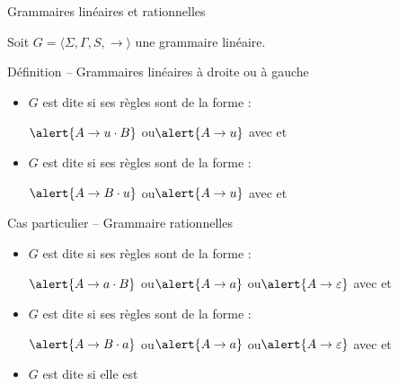 
\begingroup

\begin{frame}{Grammaires linéaires et rationnelles}

  Soit \alert{$G = \langle \Sigma, \Gamma, S, \rightarrow \rangle$} une grammaire linéaire. 

  \begin{block}{Définition -- Grammaires linéaires à droite ou à gauche}
    \begin{itemize}
    \item $G$ est dite  si ses règles sont de la forme :
      \begin{center}
        $\alert{A \rightarrow u \cdot B}$ \quad ou\quad $\alert{A \rightarrow u}$ \quad avec  et 
      \end{center}
    \item $G$ est dite  si ses règles sont de la forme :
      \begin{center}
        $\alert{A \rightarrow B \cdot u}$ \quad ou\quad $\alert{A \rightarrow u}$ \quad avec  et 
      \end{center}
    \end{itemize}
  \end{block}

  \begin{block}{Cas particulier -- Grammaire rationnelles}
    \begin{itemize}
    \item $G$ est dite  si ses règles sont de la forme :
      \begin{center}
        $\alert{A \rightarrow a \cdot B}$ \quad ou\quad $\alert{A \rightarrow a}$ \quad ou\quad $\alert{A \rightarrow \varepsilon}$
        \quad avec  et 
      \end{center}
    \item $G$ est dite  si ses règles sont de la forme :
      \begin{center}
        $\alert{A \rightarrow B \cdot a}$ \quad ou\quad $\alert{A \rightarrow a}$ \quad ou\quad $\alert{A \rightarrow \varepsilon}$
        \quad avec  et 
      \end{center}
    \item $G$ est dite  si elle est 
    \end{itemize}
  \end{block}
  
\end{frame}

\endgroup
\endinput
